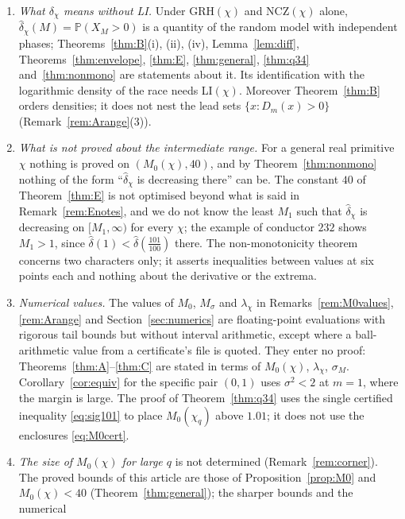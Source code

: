 \documentclass[11pt]{amsart}
\theoremstyle{definition}
\numberwithin{equation}{section}
\newcommand{\PP}{\mathbb P}
\newcommand{\hd}{\widehat\delta}
\begin{document}
\begin{enumerate}
to match. The two-dimensional statement of Lemma~\ref{lem:joint} is
obtained from the one-dimensional results by the Cram\'er--Wold device
(it could also be quoted from \cite[Theorems~1.4, 1.9]{ANS14}).
\item \emph{What $\delta_\chi$ means without LI.} Under GRH$(\chi)$
and NCZ$(\chi)$ alone, $\hd_\chi(M)=\PP(X_M>0)$ is a quantity of the
random model with independent phases; Theorems~\ref{thm:B}(i), (ii),
(iv), Lemma~\ref{lem:diff}, Theorems~\ref{thm:envelope},
\ref{thm:E}, \ref{thm:general}, \ref{thm:q34} and~\ref{thm:nonmono}
are statements about it. Its identification with the logarithmic
density of the race needs LI$(\chi)$. Moreover Theorem~\ref{thm:B}
orders densities; it does not nest the lead sets $\{x:D_m(x)>0\}$
(Remark~\ref{rem:Arange}(3)).
\item \emph{What is not proved about the intermediate range.} For a
general real primitive $\chi$ nothing is proved on
$(M_0(\chi),40)$, and by Theorem~\ref{thm:nonmono} nothing of the
form ``$\hd_\chi$ is decreasing there'' can be. The constant $40$ of
Theorem~\ref{thm:E} is not optimised beyond what is said in
Remark~\ref{rem:Enotes}, and we do not know the least $M_1$ such that
$\hd_\chi$ is decreasing on $[M_1,\infty)$ for every $\chi$; the
example of conductor $232$ shows $M_1>1$, since
$\hd(1)<\hd(\tfrac{101}{100})$ there. The non-monotonicity
theorem concerns two characters only; it asserts inequalities between
values at six points each and nothing about the derivative or the
extrema.
\item \emph{Numerical values.} The values of $M_0$, $M_\sigma$ and
$\lambda_\chi$ in Remarks~\ref{rem:M0values}, \ref{rem:Arange} and
Section~\ref{sec:numerics} are floating-point evaluations with
rigorous tail bounds but without interval arithmetic, except where a
ball-arithmetic value from a certificate's file is quoted. They enter
no proof: Theorems~\ref{thm:A}--\ref{thm:C} are stated in terms of
$M_0(\chi)$, $\lambda_\chi$, $\sigma_M$. Corollary~\ref{cor:equiv}
for the specific pair $(0,1)$ uses $\sigma^2<2$ at $m=1$, where the
margin is large. The proof of Theorem~\ref{thm:q34} uses the single
certified inequality \eqref{eq:sig101} to place $M_0(\chi_q)$ above
$1.01$; it does not use the enclosures \eqref{eq:M0cert}.
\item \emph{The size of $M_0(\chi)$ for large $q$} is not determined
(Remark~\ref{rem:corner}). The proved bounds of this article are
those of Proposition~\ref{prop:M0} and $M_0(\chi)<40$
(Theorem~\ref{thm:general}); the sharper bounds and the numerical

\end{enumerate}
\end{document}
